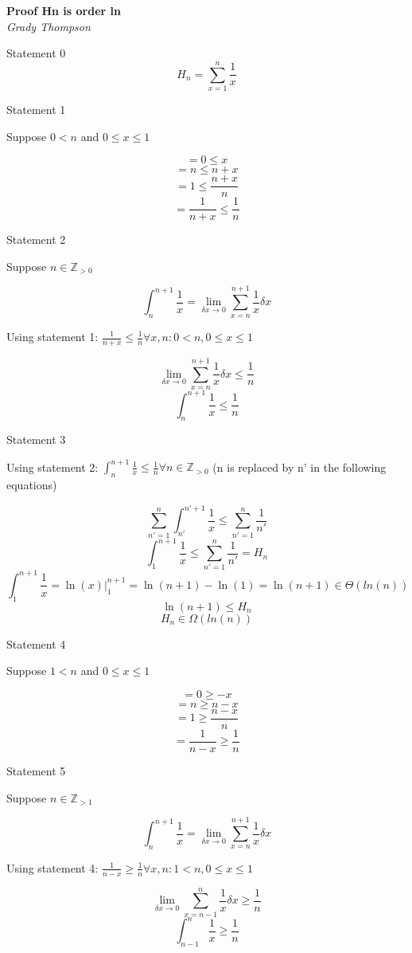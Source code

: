 \documentclass{report}
\begin{document}
\begin{titlepage}
   \begin{center}
      \Large\textbf{Proof Hn is order ln}\\
      \large\textit{Grady Thompson}
   \end{center}
\end{titlepage}

Statement 0\\
$$H_n = \sum_{x=1}^{n}\frac{1}{x}$$

Statement 1\\
{\center
	Suppose $0 < n$ and $0 \leq x \leq 1$\par
}
$$=0 \leq x$$
$$=n \leq n + x$$
$$=1 \leq \frac{n + x}{n}$$
$$=\frac{1}{n + x} \leq \frac{1}{n}$$

Statement 2\\
{\center
	Suppose $n \in \mathbb{Z}_{>0}$\par
}
$$\int_n^{n+1}\frac{1}{x} = \lim_{\delta x \rightarrow 0}\sum_{x=n}^{n+1}\frac{1}{x}\delta x$$
{\center
	Using statement 1: $\frac{1}{n + x} \leq \frac{1}{n} \forall x,n: 0 < n, 0 \leq x \leq 1$\par
}
$$\lim_{\delta x \rightarrow 0}\sum_{x=n}^{n+1}\frac{1}{x}\delta x \leq \frac{1}{n}$$
$$\int_n^{n+1}\frac{1}{x} \leq \frac{1}{n}$$

Statement 3\\
{\center
	Using statement 2: $\int_n^{n+1}\frac{1}{x} \leq \frac{1}{n} \forall n \in \mathbb{Z}_{>0}$ (n is replaced by n' in the following equations)\par
}
$$\sum_{n'=1}^{n}\int_{n'}^{n'+1}\frac{1}{x} \leq \sum_{n'=1}^{n}\frac{1}{n'}$$
$$\int_{1}^{n+1}\frac{1}{x} \leq \sum_{n'=1}^{n}\frac{1}{n'} = H_n$$
$$\int_{1}^{n+1}\frac{1}{x} = \ln(x)|_1^{n+1} = \ln(n+1) - \ln(1) = \ln(n+1) \in \Theta(ln(n))$$
$$\ln(n+1) \leq H_n$$
$$H_n \in \Omega(ln(n))$$

Statement 4\\
{\center
	Suppose $1 < n$ and $0 \leq x \leq 1$\par
}
$$=0 \geq -x$$
$$=n \geq n - x$$
$$=1 \geq \frac{n - x}{n}$$
$$=\frac{1}{n - x} \geq \frac{1}{n}$$

Statement 5\\
{\center
	Suppose $n \in \mathbb{Z}_{>1}$\par
}
$$\int_n^{n+1}\frac{1}{x} = \lim_{\delta x \rightarrow 0}\sum_{x=n}^{n+1}\frac{1}{x}\delta x$$
{\center
	Using statement 4: $\frac{1}{n - x} \geq \frac{1}{n} \forall x,n: 1 < n, 0 \leq x \leq 1$\par
}
$$\lim_{\delta x \rightarrow 0}\sum_{x=n-1}^{n}\frac{1}{x}\delta x \geq \frac{1}{n}$$
$$\int_{n-1}^{n}\frac{1}{x} \geq \frac{1}{n}$$
\end{document}
